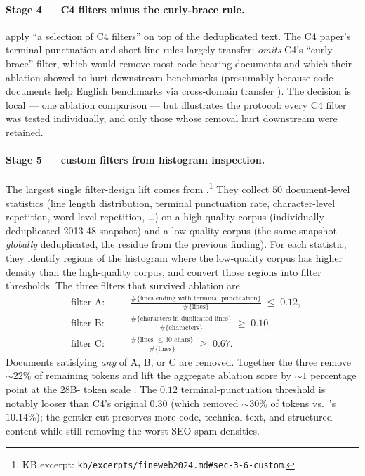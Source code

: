 \paragraph{Stage 4 --- C4 filters minus the curly-brace rule.}
\citet[\S 3.7]{fineweb2024} apply ``a selection of C4 filters'' on
top of the deduplicated text. The C4 paper's terminal-punctuation
and short-line rules largely transfer;  \emph{omits} C4's
``curly-brace'' filter, which would remove most code-bearing
documents and which their ablation showed to hurt downstream
benchmarks (presumably because code documents help English
benchmarks via cross-domain transfer \citep[\S 3.2,
$t_{ij}$]{data-mixing-laws-2024}). The decision is local --- one
ablation comparison --- but illustrates the protocol: every C4
filter was tested individually, and only those whose removal hurt
downstream were retained.

\paragraph{Stage 5 --- custom filters from histogram inspection.}
The largest single filter-design lift comes from
\citet[\S 3.6]{fineweb2024}.\footnote{KB excerpt:
\nolinkurl{kb/excerpts/fineweb2024.md#sec-3-6-custom}.} They collect
$50$ document-level statistics (line length distribution, terminal
punctuation rate, character-level repetition, word-level repetition,
\dots) on a high-quality corpus (individually deduplicated 2013-48
snapshot) and a low-quality corpus (the same snapshot
\emph{globally} deduplicated, the residue from the previous
finding). For each statistic, they identify regions of the histogram
where the low-quality corpus has higher density than the high-quality
corpus, and convert those regions into filter thresholds. The three
filters that survived ablation are
\begin{align}
&\text{filter A:} \quad &&\frac{\#\{\text{lines ending with terminal punctuation}\}}{\#\{\text{lines}\}} \;\leq\; 0.12, \nonumber \\
&\text{filter B:} \quad &&\frac{\#\{\text{characters in duplicated lines}\}}{\#\{\text{characters}\}} \;\geq\; 0.10, \nonumber \\
&\text{filter C:} \quad &&\frac{\#\{\text{lines $\leq 30$ chars}\}}{\#\{\text{lines}\}} \;\geq\; 0.67. \nonumber
\end{align}
Documents satisfying \emph{any} of A, B, or C are removed. Together
the three remove $\sim 22\%$ of remaining tokens and lift the
aggregate ablation score by $\sim 1$ percentage point at the $28$B-
token scale \citep[\S 3.6]{fineweb2024}. The $0.12$ terminal-punctuation
threshold is notably looser than C4's original $0.30$ (which removed
$\sim 30\%$ of tokens vs.\ 's $10.14\%$); the gentler cut
preserves more code, technical text, and structured content while
still removing the worst SEO-spam densities.

